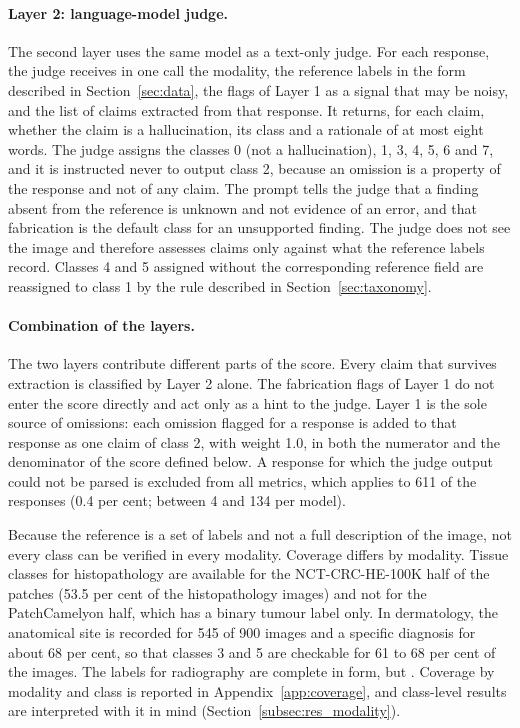 \paragraph{Layer 2: language-model judge.} The second layer uses the same model as a text-only judge. For each response, the judge receives in one call the modality, the reference labels in the form described in Section~\ref{sec:data}, the flags of Layer 1 as a signal that may be noisy, and the list of claims extracted from that response. It returns, for each claim, whether the claim is a hallucination, its class and a rationale of at most eight words. The judge assigns the classes 0 (not a hallucination), 1, 3, 4, 5, 6 and 7, and it is instructed never to output class 2, because an omission is a property of the response and not of any claim. The prompt tells the judge that a finding absent from the reference is unknown and not evidence of an error, and that fabrication is the default class for an unsupported finding. The judge does not see the image and therefore assesses claims only against what the reference labels record. Classes 4 and 5 assigned without the corresponding reference field are reassigned to class 1 by the rule described in Section~\ref{sec:taxonomy}.

\paragraph{Combination of the layers.} The two layers contribute different parts of the score. Every claim that survives extraction is classified by Layer 2 alone. The fabrication flags of Layer 1 do not enter the score directly and act only as a hint to the judge. Layer 1 is the sole source of omissions: each omission flagged for a response is added to that response as one claim of class 2, with weight 1.0, in both the numerator and the denominator of the score defined below. A response for which the judge output could not be parsed is excluded from all metrics, which applies to 611 of the \Nresponses{} responses (0.4 per cent; between 4 and 134 per model).

Because the reference is a set of labels and not a full description of the image, not every class can be verified in every modality. Coverage differs by modality. Tissue classes for histopathology are available for the NCT-CRC-HE-100K half of the patches (53.5 per cent of the histopathology images) and not for the PatchCamelyon half, which has a binary tumour label only. In dermatology, the anatomical site is recorded for 545 of 900 images and a specific diagnosis for about 68 per cent, so that classes 3 and 5 are checkable for 61 to 68 per cent of the images. The labels for radiography are complete in form, but . Coverage by modality and class is reported in Appendix~\ref{app:coverage}, and class-level results are interpreted with it in mind (Section~\ref{subsec:res_modality}).

